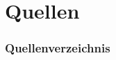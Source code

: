 \section{Quellen}
\begin{frame}[allowframebreaks]
    \frametitle{Quellenverzeichnis}
    
    
\end{frame}

